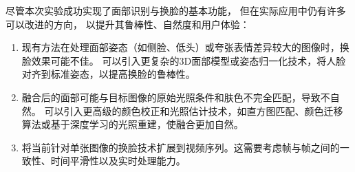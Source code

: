 尽管本次实验成功实现了面部识别与换脸的基本功能，
但在实际应用中仍有许多可以改进的方向，
以提升其鲁棒性、自然度和用户体验：

\begin{enumerate}
    \item 现有方法在处理面部姿态（如侧脸、低头）或夸张表情差异较大的图像时，换脸效果可能不佳。
    可以引入更复杂的3D面部模型或姿态归一化技术，将人脸对齐到标准姿态，以提高换脸的鲁棒性。

    \item 融合后的面部可能与目标图像的原始光照条件和肤色不完全匹配，导致不自然。
    可以引入更高级的颜色校正和光照估计技术，如直方图匹配、颜色迁移算法或基于深度学习的光照重建，使融合更加自然。

    \item 将当前针对单张图像的换脸技术扩展到视频序列。这需要考虑帧与帧之间的一致性、时间平滑性以及实时处理能力。
\end{enumerate}
